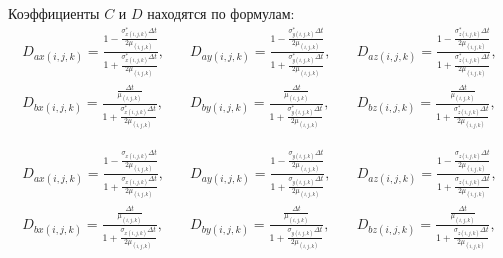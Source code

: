 Коэффициенты $C$ и $D$ находятся по формулам:
\begin{equation*}
\begin{aligned}
D_{ax (i,j,k)} =
\frac
{
    1-\frac{\sigma_{x (i,j,k)}^*\Delta t}{2\mu_{(i,j,k)}}
}{
    1+\frac{\sigma_{x (i,j,k)}^*\Delta t}{2\mu_{(i,j,k)}}
}, \\
D_{bx (i,j,k)} =
\frac
{
    \frac{\Delta t}{\mu_{(i,j,k)}}
}{
    1+\frac{\sigma_{x (i,j,k)}^*\Delta t}{2\mu_{(i,j,k)}}
},
\end{aligned}
\quad
\begin{aligned}
D_{ay (i,j,k)} =
\frac
{
    1-\frac{\sigma_{y (i,j,k)}^*\Delta t}{2\mu_{(i,j,k)}}
}{
    1+\frac{\sigma_{y (i,j,k)}^*\Delta t}{2\mu_{(i,j,k)}}
}, \\
D_{by (i,j,k)} =
\frac
{
    \frac{\Delta t}{\mu_{(i,j,k)}}
}{
    1+\frac{\sigma_{y (i,j,k)}^*\Delta t}{2\mu_{(i,j,k)}}
},
\end{aligned}
\quad
\begin{aligned}
D_{az (i,j,k)} =
\frac
{
    1-\frac{\sigma_{z (i,j,k)}^*\Delta t}{2\mu_{(i,j,k)}}
}{
    1+\frac{\sigma_{z (i,j,k)}^*\Delta t}{2\mu_{(i,j,k)}}
}, \\
D_{bz (i,j,k)} =
\frac
{
    \frac{\Delta t}{\mu_{(i,j,k)}}
}{
    1+\frac{\sigma_{z (i,j,k)}^*\Delta t}{2\mu_{(i,j,k)}}
},
\end{aligned}
\end{equation*}

\begin{equation*}
\begin{aligned}
D_{ax (i,j,k)} =
\frac
{
    1-\frac{\sigma_{x (i,j,k)}\Delta t}{2\mu_{(i,j,k)}}
}{
    1+\frac{\sigma_{x (i,j,k)}\Delta t}{2\mu_{(i,j,k)}}
}, \\
D_{bx (i,j,k)} =
\frac
{
    \frac{\Delta t}{\mu_{(i,j,k)}}
}{
    1+\frac{\sigma_{x (i,j,k)}\Delta t}{2\mu_{(i,j,k)}}
},
\end{aligned}
\quad
\begin{aligned}
D_{ay (i,j,k)} =
\frac
{
    1-\frac{\sigma_{y (i,j,k)}\Delta t}{2\mu_{(i,j,k)}}
}{
    1+\frac{\sigma_{y (i,j,k)}\Delta t}{2\mu_{(i,j,k)}}
}, \\
D_{by (i,j,k)} =
\frac
{
    \frac{\Delta t}{\mu_{(i,j,k)}}
}{
    1+\frac{\sigma_{y (i,j,k)}\Delta t}{2\mu_{(i,j,k)}}
},
\end{aligned}
\quad
\begin{aligned}
D_{az (i,j,k)} =
\frac
{
    1-\frac{\sigma_{z (i,j,k)}\Delta t}{2\mu_{(i,j,k)}}
}{
    1+\frac{\sigma_{z (i,j,k)}\Delta t}{2\mu_{(i,j,k)}}
}, \\
D_{bz (i,j,k)} =
\frac
{
    \frac{\Delta t}{\mu_{(i,j,k)}}
}{
    1+\frac{\sigma_{z (i,j,k)}\Delta t}{2\mu_{(i,j,k)}}
},
\end{aligned}
\end{equation*}

